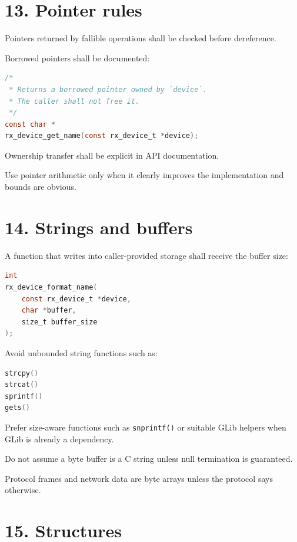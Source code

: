 \documentclass[11pt,a4paper]{article}
\begin{document}
\section{13. Pointer rules}\label{13-pointer-rules}

Pointers returned by fallible operations shall be checked before
dereference.

Borrowed pointers shall be documented:

\begin{lstlisting}[language=C]
/*
 * Returns a borrowed pointer owned by `device`.
 * The caller shall not free it.
 */
const char *
rx_device_get_name(const rx_device_t *device);
\end{lstlisting}

Ownership transfer shall be explicit in API documentation.

Use pointer arithmetic only when it clearly improves the implementation
and bounds are obvious.

\section{14. Strings and buffers}\label{14-strings-and-buffers}

A function that writes into caller-provided storage shall receive the
buffer size:

\begin{lstlisting}[language=C]
int
rx_device_format_name(
    const rx_device_t *device,
    char *buffer,
    size_t buffer_size
);
\end{lstlisting}

Avoid unbounded string functions such as:

\begin{lstlisting}[language=C]
strcpy()
strcat()
sprintf()
gets()
\end{lstlisting}

Prefer size-aware functions such as \passthrough{\lstinline!snprintf()!}
or suitable GLib helpers when GLib is already a dependency.

Do not assume a byte buffer is a C string unless null termination is
guaranteed.

Protocol frames and network data are byte arrays unless the protocol
says otherwise.

\section{15. Structures}\label{15-structures}
\end{document}
